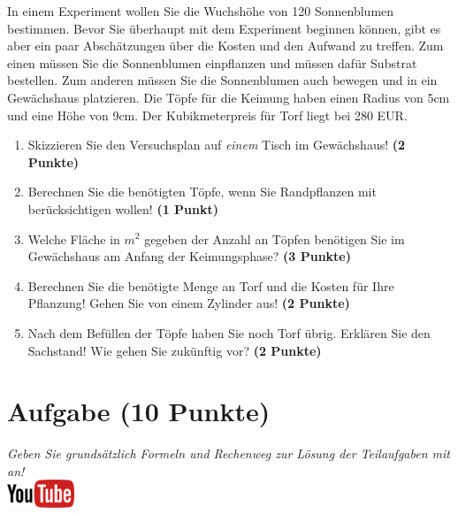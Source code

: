 \documentclass[a4paper, 10pt]{scrartcl}\usepackage[]{graphicx}\usepackage[]{xcolor}
\begin{document}
In einem Experiment wollen Sie die Wuchsh{\"o}he von 120
Sonnenblumen bestimmen. Bevor Sie {\"u}berhaupt mit dem Experiment beginnen
k{\"o}nnen, gibt es aber ein paar Absch{\"a}tzungen {\"u}ber die Kosten und den Aufwand
zu treffen. Zum einen m{\"u}ssen Sie die Sonnenblumen einpflanzen und m{\"u}ssen
daf{\"u}r Substrat bestellen. Zum anderen m{\"u}ssen Sie die Sonnenblumen auch
bewegen und in ein Gew{\"a}chshaus platzieren. Die T{\"o}pfe f{\"u}r die Keimung haben
einen Radius von 5cm und eine H{\"o}he von 9cm. Der
Kubikmeterpreis f{\"u}r Torf liegt bei 280 EUR.

\begin{enumerate}
\item Skizzieren Sie den Versuchsplan auf \textit{einem} Tisch im
  Gew{\"a}chshaus! \textbf{(2 Punkte)}
\item Berechnen Sie die ben{\"o}tigten T{\"o}pfe, wenn Sie Randpflanzen mit
  ber{\"u}cksichtigen wollen! \textbf{(1 Punkt)}
\item Welche Fl{\"a}che in $m^2$ gegeben der Anzahl an T{\"o}pfen ben{\"o}tigen Sie im
  Gew{\"a}chshaus am Anfang der Keimungsphase? \textbf{(3 Punkte)}
\item Berechnen Sie die ben{\"o}tigte Menge an Torf und die Kosten f{\"u}r Ihre
  Pflanzung! Gehen Sie von einem Zylinder aus! \textbf{(2 Punkte)}
\item Nach dem Bef{\"u}llen der T{\"o}pfe haben Sie noch Torf {\"u}brig. Erkl{\"a}ren Sie
  den Sachstand! Wie gehen Sie zuk{\"u}nftig vor? \textbf{(2 Punkte)}
\end{enumerate}


 
\clearpage

\section{Aufgabe \hfill (10 Punkte)}

\textit{Geben Sie grunds{\"a}tzlich Formeln und Rechenweg zur L{\"o}sung der
  Teilaufgaben mit an!} \\[1Ex]

\hfill\href{https://youtu.be/1B53cVFIU7Q}{\includegraphics[width =
  2cm]{img/youtube}} %
\hspace{2Ex}
\end{document}
